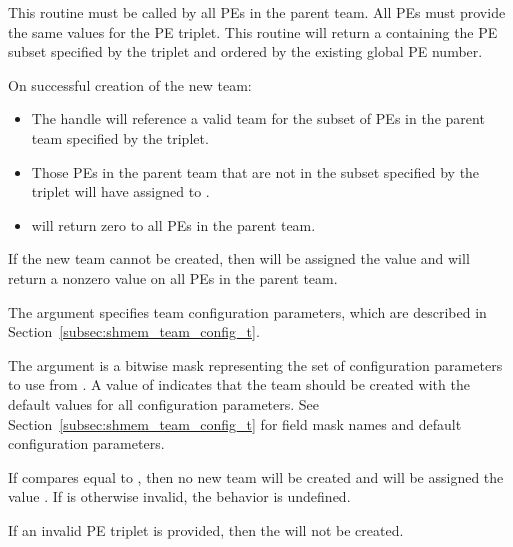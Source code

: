 \begin{apidefinition}
{This routine must be called by all \acp{PE} in the parent team.
All \acp{PE} must provide the same values for the \ac{PE} triplet.
This routine will return a  containing the \ac{PE}
subset specified by the triplet and ordered by the existing global
\ac{PE} number.

On successful creation of the new team:
\begin{itemize}
\item The  handle will reference a valid team for the
  subset of \acp{PE} in the parent team specified by the triplet.
\item Those \acp{PE} in the parent team that are not in the subset
  specified by the triplet will have  assigned to
  .
\item {} will return zero to all
  \acp{PE} in the parent team.
\end{itemize}

If the new team cannot be created, then  will be
assigned the value  and
 will return a nonzero value on all
\acp{PE} in the parent team.

The  argument specifies team configuration parameters, which are
described in Section~\ref{subsec:shmem_team_config_t}.

The  argument is a bitwise mask representing the set of
configuration parameters to use from .
A  value of  indicates that the team
should be created with the default values for all configuration parameters.
See Section~\ref{subsec:shmem_team_config_t} for field mask names and
default configuration parameters.

If 
compares equal to , then no new team
will be created and  will be assigned the value
.  If  is otherwise invalid, the behavior is undefined.

If an invalid \ac{PE} triplet is provided, then the 
will not be created.
}


\end{apidefinition}
